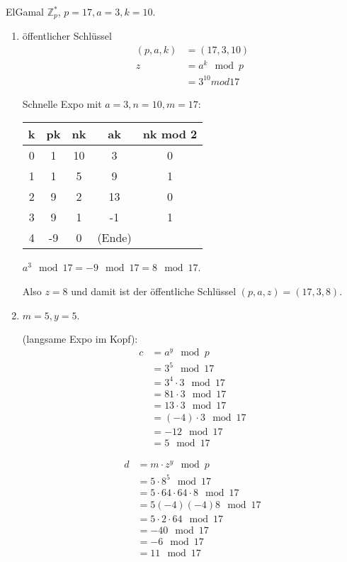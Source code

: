 ElGamal $\mathbb{Z}_{p}^{\ast}$, $p = 17, a = 3, k = 10$.

\begin{enumerate}[label=\alph*)]
\item öffentlicher Schlüssel
\begin{align*}
( p, a, k ) &= ( 17, 3, 10 ) \\
z &= a^{k} \mod p \\
&= 3^{10} mod 17
\end{align*}

Schnelle Expo mit $a = 3, n = 10, m = 17$:

\begin{tabular}{c|c|c|c|c}
k & pk & nk & ak & nk mod 2 \\
\hline
0 & 1 & 10 & 3 & 0 \\
1 & 1 & 5 & 9 & 1 \\
2 & 9 & 2 & 13 & 0 \\
3 & 9 & 1 & -1 & 1 \\
4 & -9 & 0 & (Ende)
\end{tabular}

$a^{3} \mod 17 = -9 \mod 17 = 8 \mod 17$.

Also $z = 8$ und damit ist der öffentliche Schlüssel $( p, a, z ) = (17, 3, 8)$.
\item $m = 5, y = 5$.

(langsame Expo im Kopf):
\begin{align*}
c &= a^{y} \mod p \\
&= 3^{5} \mod 17 \\
&= 3^{4}\cdot3 \mod 17 \\
&= 81\cdot 3 \mod 17 \\
&= 13\cdot 3 \mod 17 \\
&= (-4)\cdot 3 \mod 17 \\
&= -12 \mod 17 \\
&= 5 \mod 17
\end{align*}

\begin{align*}
d &= m\cdot z^{y} \mod p \\
&= 5\cdot 8^{5} \mod 17 \\
&= 5\cdot 64 \cdot 64 \cdot 8 \mod 17 \\
&= 5(-4)(-4)8 \mod 17 \\
&= 5\cdot 2 \cdot 64 \mod 17 \\
&= -40 \mod 17 \\
&= -6 \mod 17 \\
&= 11 \mod 17
\end{align*}


\end{enumerate}
